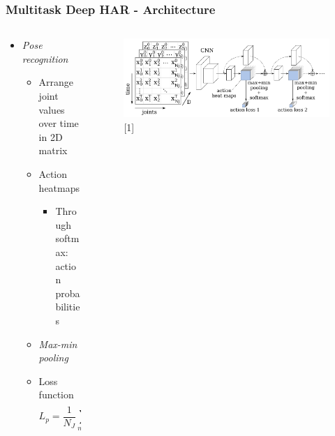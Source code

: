 \documentclass[9pt]{beamer}
\providecommand{\sourcefix}[1]{\\ \footnotesize \tugreen{Source:} [#1]}
\newenvironment{myframe}[1][]{%
\begin{frame}%
\frametitle{#1}
\setcounter{footnote}{0}


}{%
\end{frame}%
}
\begin{document}
\begin{myframe}[Multitask Deep HAR - Architecture]
	\begin{columns}[T]
        \begin{column}{.45\textwidth}
            \begin{itemize}
                \item \textit{Pose recognition}
                \begin{itemize}
                    \item Arrange joint values over time in 2D matrix
                    \item Action heatmaps
                    \begin{itemize}
                        \item Through softmax: action probabilities
                    \end{itemize}
                    \item \textit{Max-min pooling}
                    \item Loss function $$L_p = \frac{1}{N_J}\sum_{n=1}^{N_J}(~ \lvert\lvert \hat{p}_n - p_n \rvert\rvert_1 ~+~ \lvert\lvert \hat{p}_n - p_n \rvert\rvert^2_2 ~ )$$
                \end{itemize}
            \end{itemize}
        \end{column}
        \begin{column}{.45\textwidth}
            \begin{figure}
                \includegraphics[width=.99\textwidth]{jointsovertime.png}
                \sourcefix{1}
            \end{figure}
        \end{column}
	\end{columns}
\end{myframe}
\end{document}
